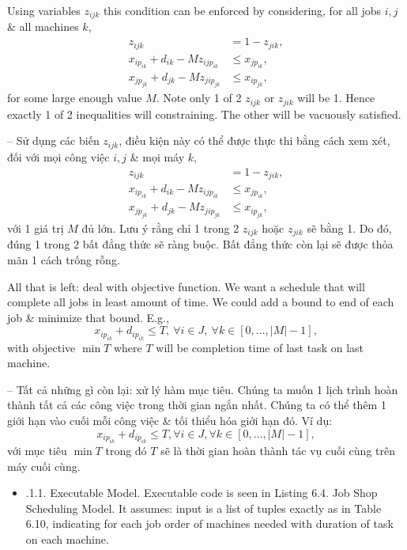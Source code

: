 \documentclass{article}
\begin{document}
\begin{itemize}
\begin{itemize}
\begin{itemize}
            Using variables $z_{ijk}$ this condition can be enforced by considering, for all jobs $i,j$ \& all machines $k$,
            \begin{align*}
                z_{ijk} &= 1 - z_{jik},\\
                x_{ip_{ik}} + d_{ik} - Mz_{ijp_{ik}}&\le x_{jp_{ik}},\\
                x_{jp_{jk}} + d_{jk} - Mz_{jip_{jk}}&\le x_{ip_{jk}},
            \end{align*}
            for some large enough value $M$. Note only 1 of 2 $z_{ijk}$ or $z_{jik}$ will be 1. Hence exactly 1 of 2 inequalities will constraining. The other will be vacuously satisfied.

            -- Sử dụng các biến $z_{ijk}$, điều kiện này có thể được thực thi bằng cách xem xét, đối với mọi công việc $i,j$ \& mọi máy $k$,
            \begin{align*}
                z_{ijk} &= 1 - z_{jik},\\
                x_{ip_{ik}} + d_{ik} - Mz_{ijp_{ik}}&\le x_{jp_{ik}},\\
                x_{jp_{jk}} + d_{jk} - Mz_{jip_{jk}}&\le x_{ip_{jk}},
            \end{align*}
            với 1 giá trị $M$ đủ lớn. Lưu ý rằng chỉ 1 trong 2 $z_{ijk}$ hoặc $z_{jik}$ sẽ bằng 1. Do đó, đúng 1 trong 2 bất đẳng thức sẽ ràng buộc. Bất đẳng thức còn lại sẽ được thỏa mãn 1 cách trống rỗng.

            All that is left: deal with objective function. We want a schedule that will complete all jobs in least amount of time. We could add a bound to end of each job \& minimize that bound. E.g.,
            \begin{equation*}
                x_{ip_{ik}} + d_{ip_{ik}}\le T,\ \forall i\in J,\ \forall k\in[0,\ldots,|M| - 1],
            \end{equation*}
            with objective $\min T$ where $T$ will be completion time of last task on last machine.

            -- Tất cả những gì còn lại: xử lý hàm mục tiêu. Chúng ta muốn 1 lịch trình hoàn thành tất cả các công việc trong thời gian ngắn nhất. Chúng ta có thể thêm 1 giới hạn vào cuối mỗi công việc \& tối thiểu hóa giới hạn đó. Ví dụ:
            \begin{equation*}
                x_{ip_{ik}} + d_{ip_{ik}}\le T, \forall i\in J, \forall k\in[0,\ldots,|M| - 1],
            \end{equation*}
            với mục tiêu $\min T$ trong đó $T$ sẽ là thời gian hoàn thành tác vụ cuối cùng trên máy cuối cùng.
            \begin{itemize}
                \item {.1.1. Executable Model.} Executable code is seen in {\sf Listing 6.4. Job Shop Scheduling Model}. It assumes: input is a list of tuples exactly as in Table 6.10, indicating for each job order of machines needed with duration of task on each machine.


\end{itemize}
\end{itemize}
\end{itemize}
\end{itemize}
\end{document}

